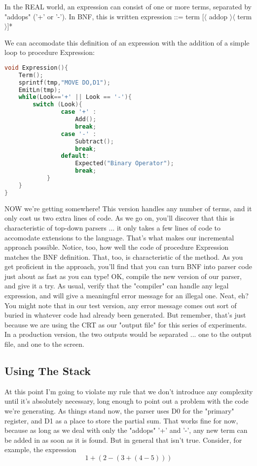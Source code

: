 In the REAL world, an expression can consist of one or more
terms, separated by "addops" ('+' or '-'). In BNF, this is
written
expression ::= term $[\langle$ addop $\rangle \langle$ term $\rangle ]$*

We can accomodate this definition of an expression with the
addition of a simple loop to procedure Expression:
\begin{lstlisting}[language=C]
	void Expression(){
	Term();	
	sprintf(tmp,"MOVE DO,D1");
	EmitLn(tmp);
	while(Look=='+' || Look == '-'){	
		switch (Look){
				case '+' :
					Add();
					break;
				case '-' :
					Subtract();
					break;	
				default:
					Expected("Binary Operator");
					break;		
			}
	}
}
\end{lstlisting}
NOW we're getting somewhere! This version handles any number of
terms, and it only cost us two extra lines of code. As we go on,
you'll discover that this is characteristic of top-down parsers
... it only takes a few lines of code to accomodate extensions to
the language. That's what makes our incremental approach
possible. Notice, too, how well the code of procedure Expression
matches the BNF definition. That, too, is characteristic of the
method. As you get proficient in the approach, you'll find that
you can turn BNF into parser code just about as fast as you can
type!
OK, compile the new version of our parser, and give it a try. As
usual, verify that the "compiler" can handle any legal
expression, and will give a meaningful error message for an
illegal one. Neat, eh? You might note that in our test version,
any error message comes out sort of buried in whatever code had
already been generated. But remember, that's just because we are
using the CRT as our "output file" for this series of
experiments. In a production version, the two outputs would be
separated ... one to the output file, and one to the screen.

\subsection{Using The Stack}
At this point I'm going to violate my rule that we don't
introduce any complexity until it's absolutely necessary, long
enough to point out a problem with the code we're generating. As
things stand now, the parser uses D0 for the "primary" register,
and D1 as a place to store the partial sum. That works fine for
now, because as long as we deal with only the "addops" '+' and
'-', any new term can be added in as soon as it is found. But in
general that isn't true. Consider, for example, the expression
\[
	1+(2-(3+(4-5)))
\]

